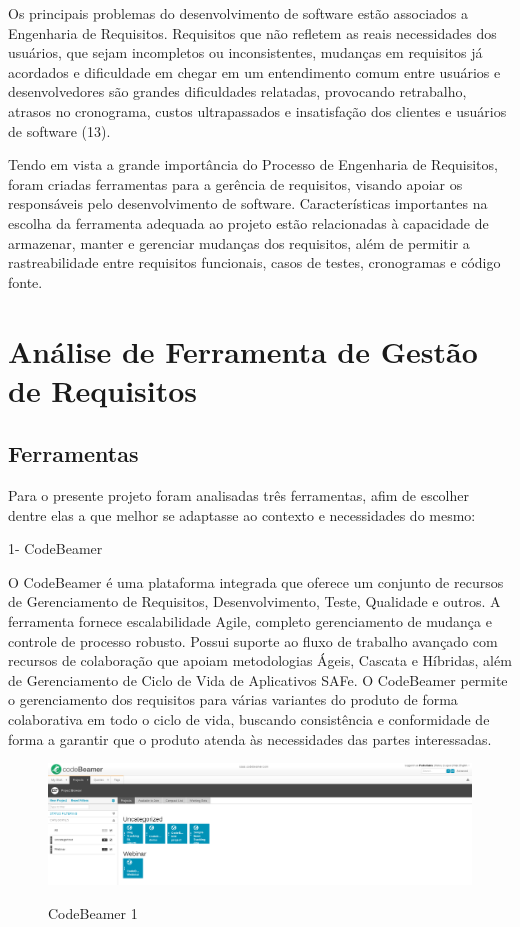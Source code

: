 Os principais problemas do desenvolvimento de software estão associados a Engenharia de Requisitos. Requisitos que não refletem as reais necessidades dos usuários, que sejam incompletos ou inconsistentes, mudanças em requisitos já acordados e dificuldade em chegar em um entendimento comum entre usuários e desenvolvedores são grandes dificuldades relatadas, provocando retrabalho, atrasos no cronograma, custos ultrapassados e insatisfação dos clientes e usuários de software (13).

Tendo em vista a grande importância do Processo de Engenharia de Requisitos, foram criadas ferramentas para a gerência de requisitos, visando apoiar os responsáveis pelo desenvolvimento de software. Características importantes na escolha da ferramenta adequada ao projeto estão relacionadas à capacidade de  armazenar, manter e gerenciar mudanças dos requisitos, além de permitir a rastreabilidade entre requisitos funcionais, casos de testes, cronogramas e código fonte.


\section {Análise de Ferramenta de Gestão de Requisitos}

\subsection{Ferramentas}

Para o presente projeto foram analisadas três ferramentas, afim de escolher dentre elas a que melhor se adaptasse ao contexto e necessidades do mesmo:

1- CodeBeamer

O CodeBeamer é uma plataforma integrada que oferece um conjunto de recursos de Gerenciamento de Requisitos, Desenvolvimento, Teste, Qualidade e outros. A ferramenta fornece escalabilidade Agile, completo gerenciamento de mudança e controle de processo robusto. Possui suporte ao fluxo de trabalho avançado com recursos de colaboração que apoiam metodologias Ágeis, Cascata e Híbridas, além de Gerenciamento de Ciclo de Vida de Aplicativos SAFe. O CodeBeamer permite o gerenciamento dos requisitos para várias variantes do produto de forma colaborativa em todo o ciclo de vida, buscando consistência e conformidade de forma a garantir que o produto atenda às necessidades das partes interessadas.

\FloatBarrier
\begin{figure}[!htpd]
		\centering
		\includegraphics[scale=0.27]{figuras/Code}
		\label{img:SAF}
		\caption{CodeBeamer 1}
\end{figure}
\FloatBarrier


